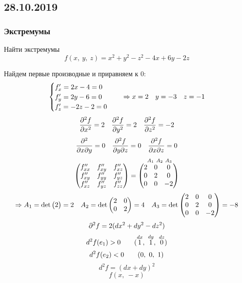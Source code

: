 \documentclass[main]{subfiles}
\begin{document}
  \subsection{28.10.2019}
  \subsubsection{Экстремумы}

  \begin{example}
    Найти экстремумы
    \[f(x,\ y,\ z) = x^2 + y^2 - z^2 - 4x + 6y - 2z\]
  \end{example}

  \begin{sol}
    Найдем первые производные и приравняем к 0:
    \[\begin{cases}
      f'_x = 2x - 4 = 0\\
      f'_y = 2y - 6 = 0\\
      f'_z = - 2z - 2 = 0
    \end{cases} \quad \Rightarrow x = 2 \quad y = -3 \quad z = -1\]
    \[\dfrac{\partial^2 f}{\partial x^2} = 2 \quad \dfrac{\partial^2 f}{\partial y^2} = 2 \quad \dfrac{\partial^2 f}{\partial z^2} = - 2\]
    \[\dfrac{\partial^2 }{\partial x \partial y} = 0 \quad \dfrac{\partial^2 f}{\partial y \partial z} = 0 \quad \dfrac{\partial^2 f}{\partial x \partial z} = 0\]
    \[\begin{pmatrix}
      f''_{xx} & f''_{xy} & f''_{xz}\\
      f''_{xy} & f''_{yy} & f''_{yz}\\
      f''_{xz} & f''_{yz} & f''_{zz}
  \end{pmatrix} = \overset{\ A_1 \ A_2 \ A_3}{\begin{pmatrix}
      2 & 0 & 0\\
      0 & 2 & 0\\
      0 & 0 & -2
    \end{pmatrix}}\]
    \[\Rightarrow A_1 = \det \begin{pmatrix}
      2
    \end{pmatrix} = 2 \quad A_2 = \det \begin{pmatrix}
      2 & 0\\
      0 & 2
    \end{pmatrix} = 4 \quad A_3 = \det \begin{pmatrix}
      2 & 0 & 0\\
      0 & 2 & 0\\
      0 & 0 & -2
    \end{pmatrix} = -8\]
    \[\partial^2 f = 2 (d x^2 + dy^2 - dz^2)\]
    \[d^2 f (e_1) > 0 \qquad (\overset{dx}{1},\ \overset{dy}{1},\ \overset{dz}{0})\]
    \[d^2 f (e_2) < 0 \qquad (0,\ 0,\ 1)\]
    \[d^2 f = (dx + dy)^2\]
    \[f(x,\ -x)\]
  \end{sol}
\end{document}
